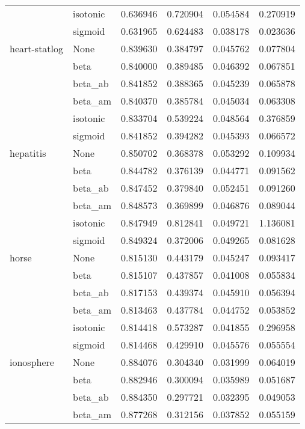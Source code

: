 \begin{tabular}{llrrrr}
        & isotonic &  0.636946 &  0.720904 &  0.054584 &  0.270919 \\
        & sigmoid &  0.631965 &  0.624483 &  0.038178 &  0.023636 \\
heart-statlog & None &  0.839630 &  0.384797 &  0.045762 &  0.077804 \\
        & beta &  0.840000 &  0.389485 &  0.046392 &  0.067851 \\
        & beta\_ab &  0.841852 &  0.388365 &  0.045239 &  0.065878 \\
        & beta\_am &  0.840370 &  0.385784 &  0.045034 &  0.063308 \\
        & isotonic &  0.833704 &  0.539224 &  0.048564 &  0.376859 \\
        & sigmoid &  0.841852 &  0.394282 &  0.045393 &  0.066572 \\
hepatitis & None &  0.850702 &  0.368378 &  0.053292 &  0.109934 \\
        & beta &  0.844782 &  0.376139 &  0.044771 &  0.091562 \\
        & beta\_ab &  0.847452 &  0.379840 &  0.052451 &  0.091260 \\
        & beta\_am &  0.848573 &  0.369899 &  0.046876 &  0.089044 \\
        & isotonic &  0.847949 &  0.812841 &  0.049721 &  1.136081 \\
        & sigmoid &  0.849324 &  0.372006 &  0.049265 &  0.081628 \\
horse & None &  0.815130 &  0.443179 &  0.045247 &  0.093417 \\
        & beta &  0.815107 &  0.437857 &  0.041008 &  0.055834 \\
        & beta\_ab &  0.817153 &  0.439374 &  0.045910 &  0.056394 \\
        & beta\_am &  0.813463 &  0.437784 &  0.044752 &  0.053852 \\
        & isotonic &  0.814418 &  0.573287 &  0.041855 &  0.296958 \\
        & sigmoid &  0.814468 &  0.429910 &  0.045576 &  0.055554 \\
ionosphere & None &  0.884076 &  0.304340 &  0.031999 &  0.064019 \\
        & beta &  0.882946 &  0.300094 &  0.035989 &  0.051687 \\
        & beta\_ab &  0.884350 &  0.297721 &  0.032395 &  0.049053 \\
        & beta\_am &  0.877268 &  0.312156 &  0.037852 &  0.055159 \\

\end{tabular}
